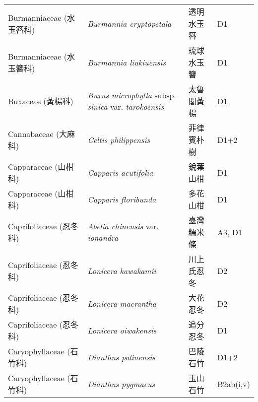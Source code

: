 \begin{longtable}{p{3cm}p{5cm}p{3cm}p{4cm}}
    Burmanniaceae (水玉簪科) & \textit{Burmannia cryptopetala}  & 透明水玉簪 & D1 \index{Burmannia@\textit{Burmannia}!cryptopetala@\textit{cryptopetala}}  \index{透明水玉簪} \\
    Burmanniaceae (水玉簪科) & \textit{Burmannia liukiuensis}  & 琉球水玉簪 & D1 \index{Burmannia@\textit{Burmannia}!liukiuensis@\textit{liukiuensis}}  \index{琉球水玉簪} \\
    Buxaceae (黃楊科) & \textit{Buxus microphylla} subsp. \textit{sinica} var. \textit{tarokoensis}  & 太魯閣黃楊 & D1 \index{Buxus@\textit{Buxus}!microphylla@\textit{microphylla}!subsp. sinica@subsp. \textit{sinica}!var. tarokoensis@var. \textit{tarokoensis}}  \index{太魯閣黃楊} \\
    Cannabaceae (大麻科) & \textit{Celtis philippensis}  & 菲律賓朴樹 & D1+2 \index{Celtis@\textit{Celtis}!philippensis@\textit{philippensis}}  \index{菲律賓朴樹} \\
    Capparaceae (山柑科) & \textit{Capparis acutifolia}  & 銳葉山柑 & D1 \index{Capparis@\textit{Capparis}!acutifolia@\textit{acutifolia}}  \index{銳葉山柑} \\
    Capparaceae (山柑科) & \textit{Capparis floribunda}  & 多花山柑 & D1 \index{Capparis@\textit{Capparis}!floribunda@\textit{floribunda}}  \index{多花山柑} \\
    Caprifoliaceae (忍冬科) & \textit{Abelia chinensis} var. \textit{ionandra}  & 臺灣糯米條 & A3, D1 \index{Abelia@\textit{Abelia}!chinensis@\textit{chinensis}!var. ionandra@var. \textit{ionandra}}  \index{臺灣糯米條} \\
    Caprifoliaceae (忍冬科) & \textit{Lonicera kawakamii}  & 川上氏忍冬 & D2 \index{Lonicera@\textit{Lonicera}!kawakamii@\textit{kawakamii}}  \index{川上氏忍冬} \\
    Caprifoliaceae (忍冬科) & \textit{Lonicera macrantha}  & 大花忍冬 & D2 \index{Lonicera@\textit{Lonicera}!macrantha@\textit{macrantha}}  \index{大花忍冬} \\
    Caprifoliaceae (忍冬科) & \textit{Lonicera oiwakensis}  & 追分忍冬 & D1 \index{Lonicera@\textit{Lonicera}!oiwakensis@\textit{oiwakensis}}  \index{追分忍冬} \\
    Caryophyllaceae (石竹科) & \textit{Dianthus palinensis}  & 巴陵石竹 & D1+2 \index{Dianthus@\textit{Dianthus}!palinensis@\textit{palinensis}}  \index{巴陵石竹} \\
    Caryophyllaceae (石竹科) & \textit{Dianthus pygmaeus}  & 玉山石竹 & B2ab(i,v) \index{Dianthus@\textit{Dianthus}!pygmaeus@\textit{pygmaeus}}  \index{玉山石竹} \\

\end{longtable}
